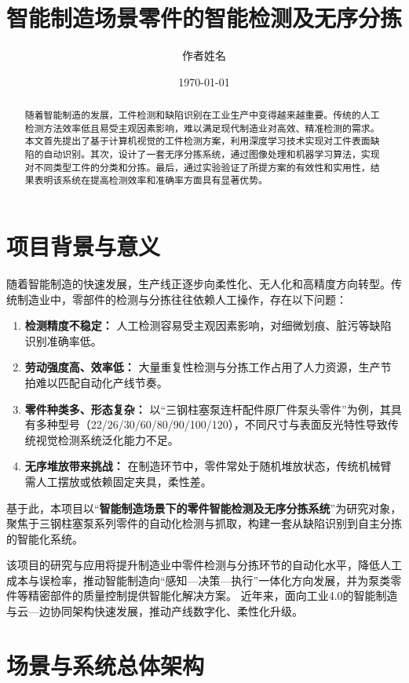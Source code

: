 \documentclass{cumcmthesis}
\title{智能制造场景零件的智能检测及无序分拣}
\author{作者姓名}
\date{\today}
\begin{document}
\newpage
\begin{abstract}
随着智能制造的发展，工件检测和缺陷识别在工业生产中变得越来越重要。传统的人工检测方法效率低且易受主观因素影响，难以满足现代制造业对高效、精准检测的需求。
本文首先提出了基于计算机视觉的工件检测方案，利用深度学习技术实现对工件表面缺陷的自动识别。其次，设计了一套无序分拣系统，通过图像处理和机器学习算法，实现对不同类型工件的分类和分拣。最后，通过实验验证了所提方案的有效性和实用性，结果表明该系统在提高检测效率和准确率方面具有显著优势。
\end{abstract}

\section{项目背景与意义}

随着智能制造的快速发展，生产线正逐步向柔性化、无人化和高精度方向转型。传统制造业中，零部件的检测与分拣往往依赖人工操作，存在以下问题：

\begin{enumerate}
    \item \textbf{检测精度不稳定：} 人工检测容易受主观因素影响，对细微划痕、脏污等缺陷识别准确率低。
    \item \textbf{劳动强度高、效率低：} 大量重复性检测与分拣工作占用了人力资源，生产节拍难以匹配自动化产线节奏。
    \item \textbf{零件种类多、形态复杂：} 以“三钢柱塞泵连杆配件原厂件泵头零件”为例，其具有多种型号（22/26/30/60/80/90/100/120），不同尺寸与表面反光特性导致传统视觉检测系统泛化能力不足。
    \item \textbf{无序堆放带来挑战：} 在制造环节中，零件常处于随机堆放状态，传统机械臂需人工摆放或依赖固定夹具，柔性差。
\end{enumerate}

基于此，本项目以“\textbf{智能制造场景下的零件智能检测及无序分拣系统}”为研究对象，聚焦于三钢柱塞泵系列零件的自动化检测与抓取，构建一套从缺陷识别到自主分拣的智能化系统。



该项目的研究与应用将提升制造业中零件检测与分拣环节的自动化水平，降低人工成本与误检率，推动智能制造向“感知—决策—执行”一体化方向发展，并为泵类零件等精密部件的质量控制提供智能化解决方案。
近年来，面向工业4.0的智能制造与云—边协同架构快速发展，推动产线数字化、柔性化升级\cite{lasi2014industry,shi2016edge,davis2015smart}。
\section{场景与系统总体架构}
\end{document}
